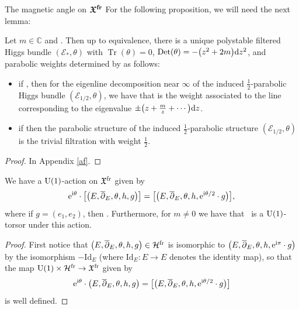 \begin{subsubsection}{The magnetic angle on $\boldsymbol{\mathfrak{X}^{{\rm fr}}}$}
For the following proposition, we will need the next lemma:

\begin{Lemma} \label{UHB} Let $m\in \mathbb{C}$ and \smash{$m^{(3)}\in \bigl(-\frac12,\frac12\bigr] \subset \mathbb{R}$}. Then up to equivalence, there is a unique polystable filtered Higgs bundle $(\mathcal{E}_*,\theta)$ with $\operatorname{Tr}(\theta)=0$, $\operatorname{Det}(\theta)=-\bigl(z^2+2m\bigr){\rm d}z^2$, and parabolic weights determined by  as follows:
\begin{itemize}\itemsep=0pt
 \item if , then for the eigenline decomposition near $\infty$ of the induced $\frac12$-parabolic Higgs bundle $(\mathcal{E}_{1/2},\theta)$, we have that  is the weight associated to the line corresponding to the eigenvalue $\pm\bigl(z+\frac{m}{z}+\cdots \bigr){\rm d}z$.
 \item if  then the parabolic structure of the induced $\frac12$-parabolic structure $(\mathcal{E}_{1/2},\theta)$ is the trivial filtration with weight $\frac12$.
\end{itemize}
\end{Lemma}

\begin{proof}
In Appendix \ref{af}.
\end{proof}

\begin{Proposition}\label{U1A} We have a ${\rm U}(1)$-action on $\mathfrak{X}^{\textnormal{fr}}$ given by
 \begin{equation}\label{U(1)act}
 {\rm e}^{{\rm i}\theta}\cdot \bigl[\bigl(E,\overline{\partial}_E,\theta,h,g\bigr)\bigr]=\bigl[\bigl(E,\overline{\partial}_E,\theta,h,{\rm e}^{{\rm i}\theta/2}\cdot g\bigr)\bigr],
 \end{equation}
 where if $g=(e_1,e_2)$, then . Furthermore, for $m\neq 0$ we have that~ is a ${\rm U}(1)$-torsor under this action.
\end{Proposition}

\begin{proof}
First notice that $\bigl(E,\overline{\partial}_E,\theta,h,g\bigr)\in \mathcal{H}^{{\rm fr}}$ is isomorphic to $\bigl(E,\overline{\partial}_E,\theta,h,{\rm e}^{{\rm i}\pi}\cdot g\bigr)$ by the isomorphism $-\text{Id}_E$ (where $\text{Id}_E\colon E\to E$ denotes the identity map), so that the map ${\rm U}(1)\times \mathcal{H}^{{\rm fr}}\to \mathfrak{X}^{{\rm fr}}$ given by
\begin{equation*}
 {\rm e}^{{\rm i}\theta}\cdot \bigl(E,\overline{\partial}_E,\theta,h,g\bigr)=\bigl[\bigl(E,\overline{\partial}_E,\theta,h,{\rm e}^{{\rm i}\theta/2}\cdot g\bigr)\bigr]
\end{equation*}
is well defined.


\end{proof}
\end{subsubsection}
